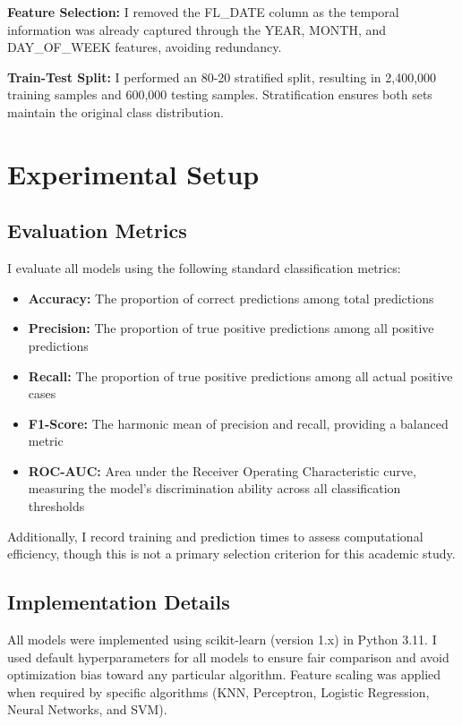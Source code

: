 \documentclass[sigconf]{acmart}
\begin{document}
\textbf{Feature Selection:} I removed the FL\_DATE column as the temporal information was already captured through the YEAR, MONTH, and DAY\_OF\_WEEK features, avoiding redundancy.

\textbf{Train-Test Split:} I performed an 80-20 stratified split, resulting in 2,400,000 training samples and 600,000 testing samples. Stratification ensures both sets maintain the original class distribution.

\section{Experimental Setup}

\subsection{Evaluation Metrics}
I evaluate all models using the following standard classification metrics:
\begin{itemize}
    \item \textbf{Accuracy:} The proportion of correct predictions among total predictions
    \item \textbf{Precision:} The proportion of true positive predictions among all positive predictions
    \item \textbf{Recall:} The proportion of true positive predictions among all actual positive cases
    \item \textbf{F1-Score:} The harmonic mean of precision and recall, providing a balanced metric
    \item \textbf{ROC-AUC:} Area under the Receiver Operating Characteristic curve, measuring the model's discrimination ability across all classification thresholds
\end{itemize}

Additionally, I record training and prediction times to assess computational efficiency, though this is not a primary selection criterion for this academic study.

\subsection{Implementation Details}
All models were implemented using scikit-learn (version 1.x) in Python 3.11. I used default hyperparameters for all models to ensure fair comparison and avoid optimization bias toward any particular algorithm. Feature scaling was applied when required by specific algorithms (KNN, Perceptron, Logistic Regression, Neural Networks, and SVM).
\end{document}

